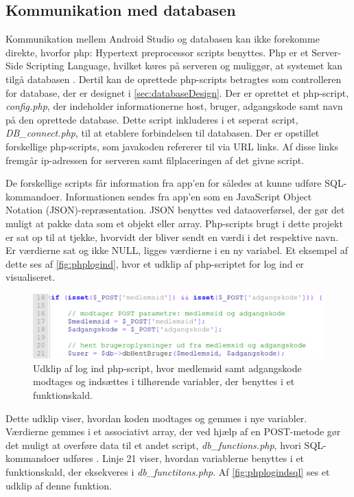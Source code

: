 \subsection*{Kommunikation med databasen}
Kommunikation mellem Android Studio og databasen kan ikke forekomme direkte, hvorfor php: Hypertext preprocessor scripts benyttes. Php er et Server-Side Scripting Language, hvilket køres på serveren og muliggør, at systemet kan tilgå databasen \cite{silbershatz2011}. Dertil kan de oprettede php-scripts betragtes som controlleren for database, der er designet i \autoref{sec:databaseDesign}.
Der er oprettet et php-script, \textit{config.php}, der indeholder informationerne host, bruger, adgangskode samt navn på den oprettede database. Dette script inkluderes i et seperat script, \textit{DB\_connect.php}, til at etablere forbindelsen til databasen. Der er opstillet forskellige php-scripts, som javakoden refererer til via URL links. Af disse links fremgår ip-adressen for serveren samt filplaceringen af det givne script. 

De forskellige scripts får information fra app'en for således at kunne udføre SQL-kommandoer. Informationen sendes fra app'en som en JavaScript Object Notation (JSON)-repræsentation. JSON benyttes ved dataoverførsel, der gør det muligt at pakke data som et objekt eller array.\cite{silbershatz2011} Php-scripts brugt i dette projekt er sat op til at tjekke, hvorvidt der bliver sendt en værdi i det respektive navn. Er værdierne sat og ikke NULL, ligges værdierne i en ny variabel. Et eksempel af dette ses af \autoref{fig:phplogind}, hvor et udklip af php-scriptet for log ind er visualiseret. 

\begin{figure} [H]
\centering
\includegraphics[width=1\textwidth]{figures/imple/phplogind}
\caption{Udklip af log ind php-script, hvor medlemsid samt adgangskode modtages og indsættes i tilhørende variabler, der benyttes i et funktionskald.}
\label{fig:phplogind}
\end{figure}

\noindent
Dette udklip viser, hvordan koden modtages og gemmes i nye variabler. Værdierne gemmes i et associativt array, der ved hjælp af en POST-metode gør det muligt at overføre data til et andet script, \textit{db\_functions.php}, hvori SQL-kommandoer udføres \cite{w3schools2017}. Linje 21 viser, hvordan variablerne benyttes i et funktionskald, der eksekveres i \textit{db\_functitons.php}. Af \autoref{fig:phplogindsql} ses et udklip af denne funktion.

